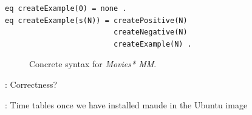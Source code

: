 \documentclass[draft]{llncs}
\newcommand{\todo}[1]{\textbf{\color{red}{TO-DO}}: #1}
\newcommand{\todo}[1]{}
\newcommand{\code}[1]{{\texttt{#1}}}
\begin{document}
\begin{lstlisting}[label=lst:createexampleeq, caption=Equation \code{createExample(N:Nat)}.]
eq createExample(0) = none .
eq createExample(s(N)) = createPositive(N)
                         createNegative(N)
                         createExample(N) .
\end{lstlisting}


\begin{figure}[htp]
  \hfill
  \hfill
  \hfill
  \hfill
  \caption{Concrete syntax for \textit{Movies* MM}.}
  \label{fig:concreteSyntax}
\end{figure}

\todo{Correctness?}

\todo{Time tables once we have installed maude in the Ubuntu image}
\end{document}
